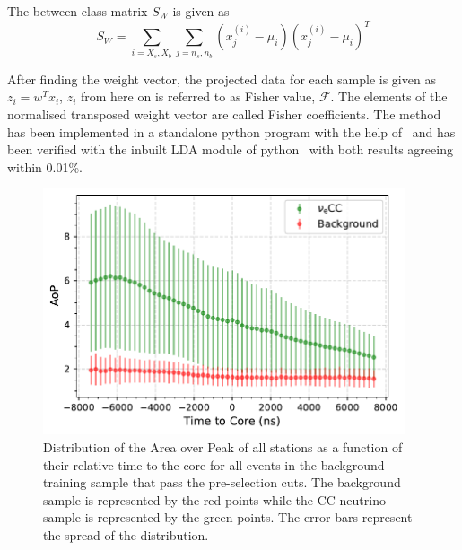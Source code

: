The between class matrix $S_{W}$ is given as
\begin{equation}
  S_{W} = \sum_{i = X_s,X_b} \sum_{j = n_s,n_b } (x^{(i)}_j - \mu_i) (x^{(i)}_j - \mu_i)^T
\end{equation}

After finding the weight vector, the projected data for each sample is given as $z_i = w^Tx_i$, $z_i$ from here on is referred to as Fisher value, $\mathcal{F}$. The elements of the normalised transposed weight vector are called Fisher coefficients. The method has been implemented in a standalone python program with the help of~\cite{JaimeAlvarezMuniz_conversation} and has been verified with the inbuilt LDA module of python~\cite{scikit_Learn} with both results agreeing within 0.01\%. 

\begin{figure}[h!]
  \centering
  \includegraphics[width=0.95\textwidth]{thesis_figures/Nu_analysis/Selection_Evo_AoP_Time_mean_CC_redcut.pdf}
  \caption{Distribution of the Area over Peak of all stations as a function of their relative time to the core for all events in the background training sample that pass the pre-selection cuts. The background sample is represented by the red points while the CC neutrino sample is represented by the green points. The error bars represent the spread of the distribution.}
  \label{fig:Time_to_core}
\end{figure}

